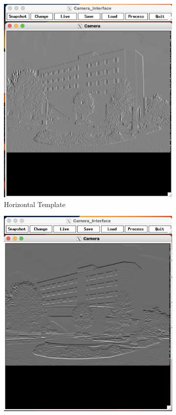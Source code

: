 \documentclass[12pt]{article}
\begin{document}
\begin{figure}
	\centering
	\begin{subfigure}[b]{0.475\textwidth}
		\centering
		\includegraphics[width=\textwidth]{hw3_results/p1_nedd_hor}
		\caption[]%
		{{\small Horizontal Template}}    
		\label{fig:mean and std of net12}
	\end{subfigure}
	\hfill
	\begin{subfigure}[b]{0.475\textwidth}  
		\centering 
		\includegraphics[width=\textwidth]{hw3_results/p1_nedd_vert}

\end{subfigure}
\end{figure}
\end{document}

